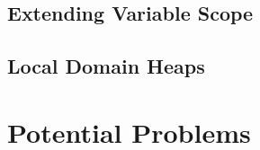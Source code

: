 		\subsection{Extending Variable Scope}
			\label{sub:eea:opt:scopeext}

		\subsection{Local Domain Heaps}
			\label{sub:eea:opt:ldh}

	\section{Potential Problems}
		\label{sec:eea:probs}
